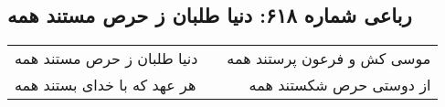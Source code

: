 \begin{center}
\section*{رباعی شماره ۶۱۸: دنیا طلبان ز حرص مستند همه}
\label{sec:sh618}
\begin{longtable}{l p{0.5cm} r}
دنیا طلبان ز حرص مستند همه
&&
موسی کش و فرعون پرستند همه
\\
هر عهد که با خدای بستند همه
&&
از دوستی حرص شکستند همه
\\
\end{longtable}
\end{center}

